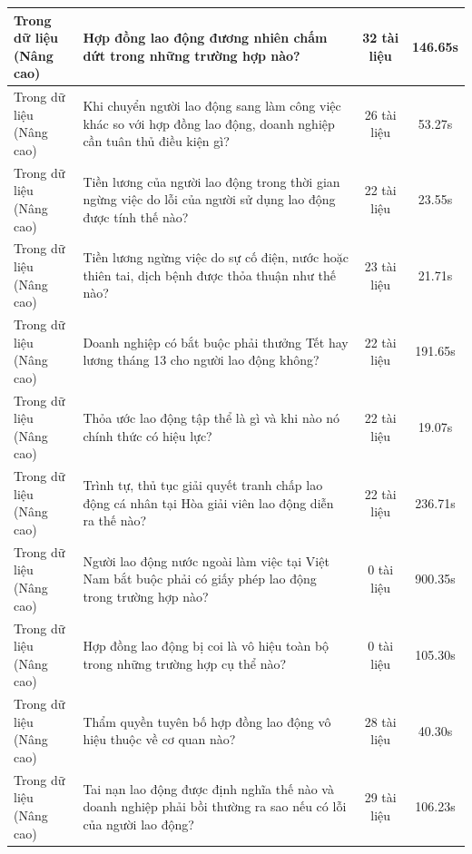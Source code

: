 \begin{longtable}{|l|p{6.5cm}|c|c|}
\makecell[l]{Trong dữ liệu\\(Nâng cao)} & Hợp đồng lao động đương nhiên chấm dứt trong những trường hợp nào? & 32 tài liệu & 146.65s \\ \hline
\makecell[l]{Trong dữ liệu\\(Nâng cao)} & Khi chuyển người lao động sang làm công việc khác so với hợp đồng lao động, doanh nghiệp cần tuân thủ điều kiện gì? & 26 tài liệu & 53.27s \\ \hline
\makecell[l]{Trong dữ liệu\\(Nâng cao)} & Tiền lương của người lao động trong thời gian ngừng việc do lỗi của người sử dụng lao động được tính thế nào? & 22 tài liệu & 23.55s \\ \hline
\makecell[l]{Trong dữ liệu\\(Nâng cao)} & Tiền lương ngừng việc do sự cố điện, nước hoặc thiên tai, dịch bệnh được thỏa thuận như thế nào? & 23 tài liệu & 21.71s \\ \hline
\makecell[l]{Trong dữ liệu\\(Nâng cao)} & Doanh nghiệp có bắt buộc phải thưởng Tết hay lương tháng 13 cho người lao động không? & 22 tài liệu & 191.65s \\ \hline
\makecell[l]{Trong dữ liệu\\(Nâng cao)} & Thỏa ước lao động tập thể là gì và khi nào nó chính thức có hiệu lực? & 22 tài liệu & 19.07s \\ \hline
\makecell[l]{Trong dữ liệu\\(Nâng cao)} & Trình tự, thủ tục giải quyết tranh chấp lao động cá nhân tại Hòa giải viên lao động diễn ra thế nào? & 22 tài liệu & 236.71s \\ \hline
\makecell[l]{Trong dữ liệu\\(Nâng cao)} & Người lao động nước ngoài làm việc tại Việt Nam bắt buộc phải có giấy phép lao động trong trường hợp nào? & 0 tài liệu & 900.35s \\ \hline
\makecell[l]{Trong dữ liệu\\(Nâng cao)} & Hợp đồng lao động bị coi là vô hiệu toàn bộ trong những trường hợp cụ thể nào? & 0 tài liệu & 105.30s \\ \hline
\makecell[l]{Trong dữ liệu\\(Nâng cao)} & Thẩm quyền tuyên bố hợp đồng lao động vô hiệu thuộc về cơ quan nào? & 28 tài liệu & 40.30s \\ \hline
\makecell[l]{Trong dữ liệu\\(Nâng cao)} & Tai nạn lao động được định nghĩa thế nào và doanh nghiệp phải bồi thường ra sao nếu có lỗi của người lao động? & 29 tài liệu & 106.23s \\ \hline

\end{longtable}
